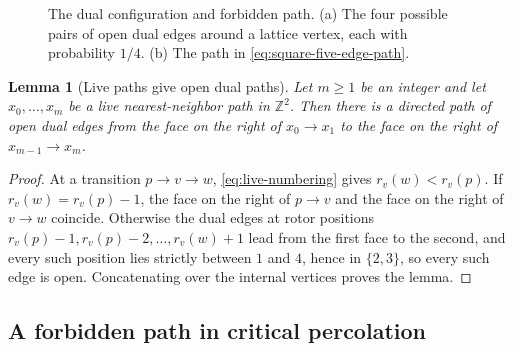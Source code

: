 \documentclass[11pt]{amsart}
\theoremstyle{plain}
\newtheorem{lemma}[theorem]{Lemma}
\theoremstyle{definition}
\newcommand{\Z}{\mathbb Z}
\begin{document}
\begin{figure}[t]
		\caption{The dual configuration and forbidden path.  \textup{(a)} The four
			possible pairs of open dual edges around a lattice vertex, each with
			probability $1/4$.  \textup{(b)} The path in
			\eqref{eq:square-five-edge-path}. }
		\label{fig:square-comparison}
	\end{figure}
	
	\begin{lemma}[Live paths give open dual paths]
		\label{lem:square-dual-path}
		Let $m\geq1$ be an integer and let $x_0,\ldots,x_m$ be a live nearest-neighbor
		path in $\Z^2$.
		Then there is a directed path of open dual edges from the face on the right of
		$x_0\to x_1$ to the face on the right of $x_{m-1}\to x_m$.
	\end{lemma}
	
	\begin{proof}
		At a transition $p\to v\to w$, \eqref{eq:live-numbering} gives
		$r_v(w)<r_v(p)$.  If $r_v(w)=r_v(p)-1$, the face on the right of $p\to v$ and
		the face on the right of $v\to w$ coincide.  Otherwise the dual edges at
		rotor positions $r_v(p)-1,r_v(p)-2,\ldots,r_v(w)+1$ lead from the first face
		to the second, and every such position lies strictly between $1$ and $4$,
		hence in $\{2,3\}$, so every such edge is open.  Concatenating over the
		internal vertices proves the lemma.
	\end{proof}
	
	\subsection{A forbidden path in critical percolation}
	\label{sec:square-diminishment}
	
\end{document}
